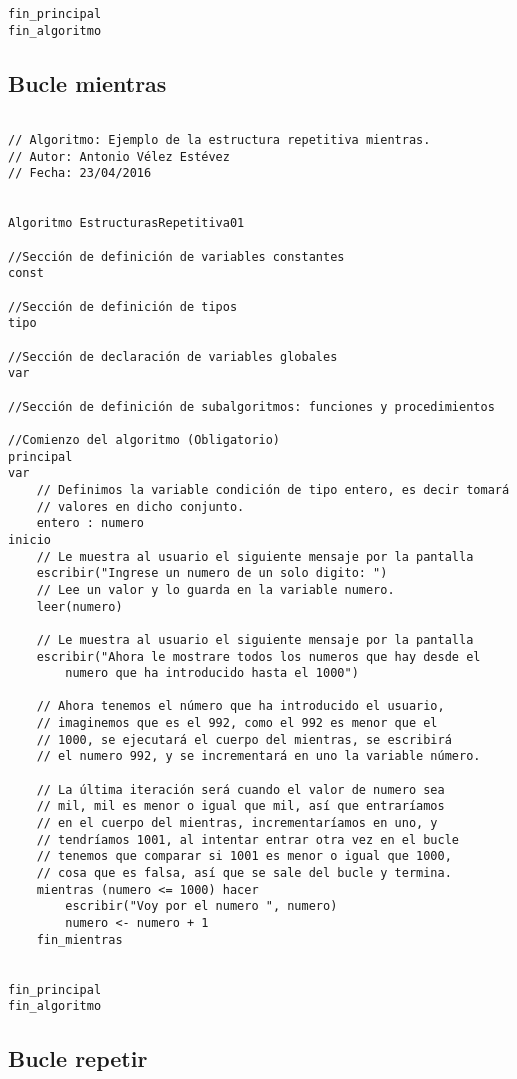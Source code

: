 \documentclass{article}
\begin{document}
\begin{appendices}
\begin{lstlisting}[language = pseudocodigoesp]
fin_principal
fin_algoritmo
\end{lstlisting}
\subsection{Bucle mientras}
\begin{lstlisting}[language = pseudocodigoesp]

// Algoritmo: Ejemplo de la estructura repetitiva mientras.
// Autor: Antonio Vélez Estévez
// Fecha: 23/04/2016

 
Algoritmo EstructurasRepetitiva01

//Sección de definición de variables constantes
const 
	
//Sección de definición de tipos
tipo

//Sección de declaración de variables globales	
var

//Sección de definición de subalgoritmos: funciones y procedimientos	

//Comienzo del algoritmo (Obligatorio)
principal	
var
	// Definimos la variable condición de tipo entero, es decir tomará
	// valores en dicho conjunto.
	entero : numero
inicio 	
	// Le muestra al usuario el siguiente mensaje por la pantalla
	escribir("Ingrese un numero de un solo digito: ")
	// Lee un valor y lo guarda en la variable numero.
	leer(numero)
	
	// Le muestra al usuario el siguiente mensaje por la pantalla
	escribir("Ahora le mostrare todos los numeros que hay desde el
        numero que ha introducido hasta el 1000")
	
	// Ahora tenemos el número que ha introducido el usuario,
	// imaginemos que es el 992, como el 992 es menor que el
	// 1000, se ejecutará el cuerpo del mientras, se escribirá
	// el numero 992, y se incrementará en uno la variable número.
	
	// La última iteración será cuando el valor de numero sea
	// mil, mil es menor o igual que mil, así que entraríamos
	// en el cuerpo del mientras, incrementaríamos en uno, y 
	// tendríamos 1001, al intentar entrar otra vez en el bucle
	// tenemos que comparar si 1001 es menor o igual que 1000,
	// cosa que es falsa, así que se sale del bucle y termina.
	mientras (numero <= 1000) hacer
		escribir("Voy por el numero ", numero)
		numero <- numero + 1
	fin_mientras
	

fin_principal
fin_algoritmo
\end{lstlisting}
\subsection{Bucle repetir}
\begin{lstlisting}[language = pseudocodigoesp]


\end{lstlisting}
\end{appendices}
\end{document}
